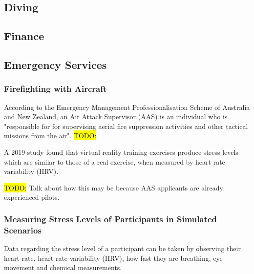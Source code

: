 \documentclass{article}
\begin{document}

\subsection{Diving}



\subsection{Finance}

\subsection{Emergency Services}

\subsubsection{Firefighting with Aircraft}

According to the Emergency Management Professionalisation Scheme of Australia and New Zealand, an Air Attack Supervisor (AAS) is an individual who is "responsible for for supervising aerial fire suppression activities and other tactical missions from the air". \hl{TODO:}


A 2019 study found that virtual reality training exercises produce stress levels which are similar to those of a real exercise, when measured by heart rate variability (HRV). \cite{8797889}

\hl{TODO:} Talk about how this may be because AAS applicants are already experienced pilots.

\subsubsection{Measuring Stress Levels of Participants in Simulated Scenarios}

Data regarding the stress level of a participant can be taken by observing their heart rate, heart rate variability (HRV), how fast they are breathing, eye movement and chemical measurements. \cite{8797889}
\end{document}
